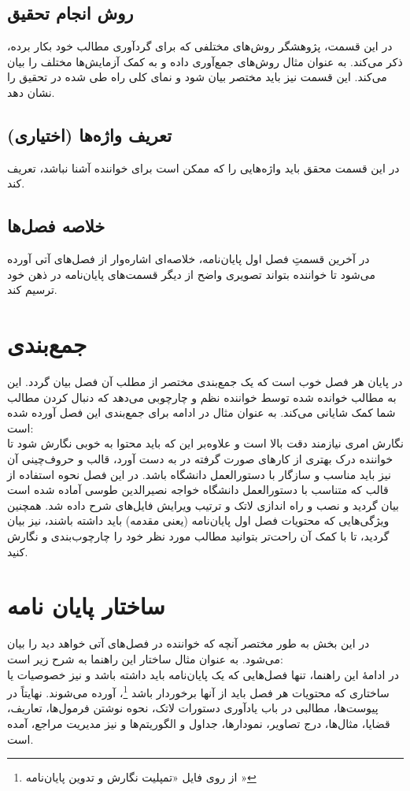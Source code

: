 \subsection{روش انجام تحقیق}
در این قسمت، پژوهشگر روش‌های مختلفی که برای گردآوری مطالب خود بکار برده، ذکر می‌کند. به عنوان مثال روش‌های جمع‌آوری داده و به کمک آزمایش‌ها مختلف را بیان می‌کند. این قسمت نیز باید مختصر بیان شود و نمای کلی راه طی شده در تحقیق را نشان دهد.

\subsection{تعریف واژه‌ها (اختیاری)}
در این قسمت محقق باید واژه‌هایی را که ممکن است برای خواننده آشنا نباشد، تعریف کند.

\subsection{خلاصه فصل‌ها}
در آخرین قسمتِ فصل اول پایان‌نامه، خلاصه‌ای اشاره‌وار از فصل‌های آتی آورده می‌شود تا خواننده بتواند تصویری واضح از دیگر قسمت‌های پایان‌نامه در ذهن خود ترسیم کند.

\section{جمع‌بندی}
در پایان هر فصل خوب است که یک جمع‌بندی مختصر از مطلب آن فصل بیان گردد. این به مطالب خوانده شده توسط خواننده نظم و چارچوبی می‌دهد که دنبال کردن مطالب شما کمک شایانی می‌کند.
به عنوان مثال در ادامه برای جمع‌بندی این فصل آورده شده است:\\
نگارش \پ امری نیازمند دقت بالا است و علاوه‌بر این که باید محتوا به خوبی نگارش شود تا خواننده درک بهتری از کار‌های صورت گرفته در \پ به دست آورد، قالب و حروف‌چینی آن نیز باید مناسب و سازگار با دستورالعمل دانشگاه باشد.  در این فصل نحوه استفاده از قالب \پ که متناسب با دستورالعمل دانشگاه خواجه نصیرالدین طوسی آماده شده است بیان گردید و نصب و راه اندازی لاتک و ترتیب ویرایش فایل‌های شرح داده شد. همچنین ویژگی‌هایی که محتویات فصل اول پایان‌نامه (یعنی مقدمه) باید داشته باشند، نیز بیان گردید، تا با کمک آن راحت‌تر بتوانید مطالب مورد نظر خود را چارچوب‌بندی و نگارش کنید.

\section{ساختار پایان نامه}
در این بخش به طور مختصر آنچه که خواننده در فصل‌های آتی خواهد دید را بیان می‌شود. به عنوان مثال ساختار این راهنما به شرح زیر است:\\
در ادامهٔ این راهنما، تنها فصل‌هایی که یک پایان‌نامه باید داشته باشد و نیز خصوصیات یا ساختاری که محتویات هر فصل باید از آنها برخوردار باشد%
\footnote{از روی فایل «تمپلیت نگارش و تدوین پایان‌نامه \cite{KNTUThesisGuide}»}،
آورده می‌شوند. نهایتاً  در پیوست‌ها، مطالبی در باب یادآوری دستورات لاتک، نحوه نوشتن فرمول‌ها، تعاریف، قضایا، مثال‌ها، درج تصاویر، نمودارها، جداول و الگوریتم‌ها و نیز مدیریت مراجع، آمده است.

